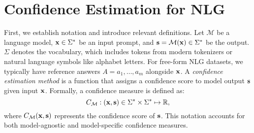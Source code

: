 
\section{Confidence Estimation for NLG}\label{sec:prelim}

First, we establish notation and introduce relevant definitions.
Let $\mathcal{M}$ be a language model, $\mathbf{x}\in\Sigma^*$ be an input prompt, and $\mathbf{s}=\mathcal{M}(\mathbf{x})\in\Sigma^*$ be the output. 
$\Sigma$ denotes the vocabulary, which includes tokens from modern tokenizers or natural language symbols like alphabet letters. 
For free-form NLG datasets, we typically have reference answers $A={a_1,\ldots,a_m}$ alongside $\mathbf{x}$. A \textit{confidence estimation method} is a function that assigns a confidence score to model output $\mathbf{s}$ given input $\mathbf{x}$. 
Formally, a confidence measure is defined as:
\begin{equation}
    C_{\mathcal{M}}: (\mathbf{x}, \mathbf{s}) \in \Sigma^*\times\Sigma^*  \mapsto \mathbb{R},
\end{equation}
where $C_{\mathcal{M}}(\mathbf{x},\mathbf{s})$ represents the confidence score of $\mathbf{s}$. This notation accounts for both model-agnostic and model-specific confidence measures.






